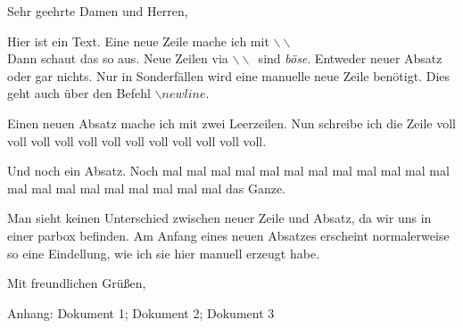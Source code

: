 \documentclass[12pt,a4paper]{scrlttr2}
\begin{document}
\begin{letter}{}
\firsthead{} %
\firstfoot{} %

\pagestyle{empty} %


\parbox{\textwidth}{ %
\opening{Sehr geehrte Damen und Herren,}

Hier ist ein Text. Eine neue Zeile mache ich mit $\backslash \backslash$ ~ \\%
Dann schaut das so aus. Neue Zeilen via $\backslash \backslash$~sind \emph{böse}. Entweder neuer Absatz oder gar nichts. Nur in Sonderfällen wird eine manuelle neue Zeile benötigt. Dies geht auch über den Befehl $\backslash newline$.

Einen neuen Absatz mache ich mit zwei Leerzeilen. Nun schreibe ich die Zeile voll voll voll voll voll voll voll voll voll voll voll voll.

Und noch ein Absatz. Noch mal mal mal mal mal mal mal mal mal mal mal mal mal mal mal mal mal mal mal mal mal das Ganze.

\hspace{15pt} Man sieht keinen Unterschied zwischen neuer Zeile und Absatz, da wir uns in einer parbox befinden. Am Anfang eines neuen Absatzes erscheint normalerweise so eine Eindellung, wie ich sie hier manuell erzeugt habe.

\closing{Mit freundlichen Grüßen,}

}
\vfill %
\parbox{\textwidth}{Anhang: Dokument 1; Dokument 2; Dokument 3}

\end{letter}
\end{document}
